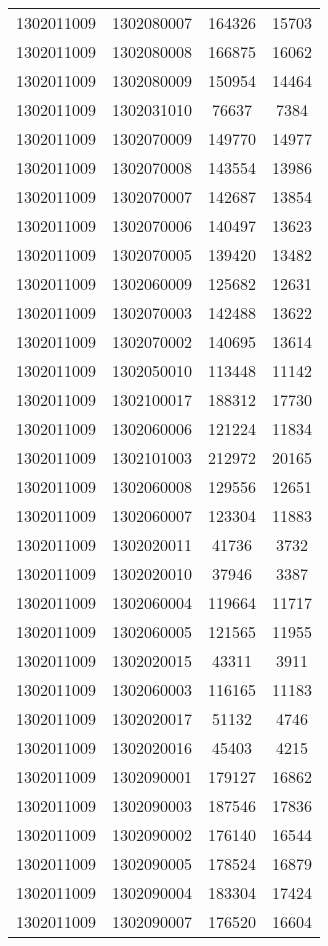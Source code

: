 \begin{longtable}{llcc}
1302011009 & 1302080007 & 164326 & 15703\\
1302011009 & 1302080008 & 166875 & 16062\\
1302011009 & 1302080009 & 150954 & 14464\\
1302011009 & 1302031010 & 76637 & 7384\\
1302011009 & 1302070009 & 149770 & 14977\\
1302011009 & 1302070008 & 143554 & 13986\\
1302011009 & 1302070007 & 142687 & 13854\\
1302011009 & 1302070006 & 140497 & 13623\\
1302011009 & 1302070005 & 139420 & 13482\\
1302011009 & 1302060009 & 125682 & 12631\\
1302011009 & 1302070003 & 142488 & 13622\\
1302011009 & 1302070002 & 140695 & 13614\\
1302011009 & 1302050010 & 113448 & 11142\\
1302011009 & 1302100017 & 188312 & 17730\\
1302011009 & 1302060006 & 121224 & 11834\\
1302011009 & 1302101003 & 212972 & 20165\\
1302011009 & 1302060008 & 129556 & 12651\\
1302011009 & 1302060007 & 123304 & 11883\\
1302011009 & 1302020011 & 41736 & 3732\\
1302011009 & 1302020010 & 37946 & 3387\\
1302011009 & 1302060004 & 119664 & 11717\\
1302011009 & 1302060005 & 121565 & 11955\\
1302011009 & 1302020015 & 43311 & 3911\\
1302011009 & 1302060003 & 116165 & 11183\\
1302011009 & 1302020017 & 51132 & 4746\\
1302011009 & 1302020016 & 45403 & 4215\\
1302011009 & 1302090001 & 179127 & 16862\\
1302011009 & 1302090003 & 187546 & 17836\\
1302011009 & 1302090002 & 176140 & 16544\\
1302011009 & 1302090005 & 178524 & 16879\\
1302011009 & 1302090004 & 183304 & 17424\\
1302011009 & 1302090007 & 176520 & 16604\\

\end{longtable}
